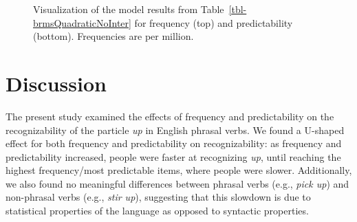 \documentclass[
  12pt,
  letterpaper,
]{scrreprt}
\begin{document}
\begin{figure}[htbp]

\caption{\label{fig-FullQuadraticPlot}Visualization of the model results
from Table~\ref{tbl-brmsQuadraticNoInter} for frequency (top) and
predictability (bottom). Frequencies are per million.}


\end{figure}%

\section{Discussion}\label{discussion-4}

The present study examined the effects of frequency and predictability
on the recognizability of the particle \emph{up} in English phrasal
verbs. We found a U-shaped effect for both frequency and predictability
on recognizability: as frequency and predictability increased, people
were faster at recognizing \emph{up}, until reaching the highest
frequency/most predictable items, where people were slower.
Additionally, we also found no meaningful differences between phrasal
verbs (e.g., \emph{pick up}) and non-phrasal verbs (e.g., \emph{stir
up}), suggesting that this slowdown is due to statistical properties of
the language as opposed to syntactic properties.
\end{document}
